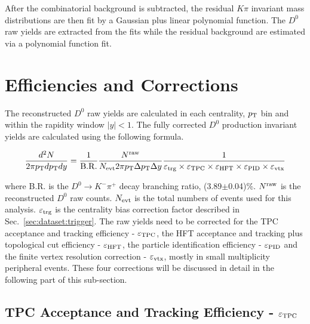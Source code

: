 \documentclass[%
 reprint,	
 amsmath,amssymb,
 aps,
 prc,
]{revtex4-1}
\begin{document}
After the combinatorial background is subtracted, the residual $K\pi$ invariant mass distributions are then fit by a Gaussian plus linear polynomial function. %
The $D^0$ raw yields are extracted from the fits while the residual background are estimated via a polynomial function fit.

\section{\label{sec:correction}Efficiencies and Corrections}
The reconstructed $D^0$ raw yields are calculated in each centrality, $p_{\rm T}$ bin and within the rapidity window $|y|<1$. The fully corrected $D^0$ production invariant yields are calculated using the following formula.

\begin{widetext}
\[
  \frac{d^2N}{2\pi p_{\rm T}dp_{\rm T}dy} = \frac{1}{\rm B.R.} \frac{N^{\rm raw}}{N_{\rm evt} 2\pi p_{\rm T}\Delta p_{\rm T}\Delta y} \frac{1}{\varepsilon_{\rm trg}\times\varepsilon_{\rm TPC}\times\varepsilon_{\rm HFT}\times\varepsilon_{\rm PID}\times\varepsilon_{\rm vtx}}
\]
\label{equ:invariantyield}
\end{widetext}

where B.R. is the $D^0\rightarrow K^-\pi^+$ decay branching ratio, (3.89$\pm$0.04)\%. $N^{\rm raw}$ is the reconstructed $D^0$ raw counts. $N_{\rm evt}$ is the total numbers of events used for this analysis. $\varepsilon_{\rm trg}$ is the centrality bias correction factor described in Sec.~\ref{sec:dataset:trigger}. The raw yields need to be corrected for the TPC acceptance and tracking efficiency - $\varepsilon_{\rm TPC}$, the HFT acceptance and tracking plus topological cut efficiency - $\varepsilon_{\rm HFT}$, the particle identification efficiency - $\varepsilon_{\rm PID}$ and the finite vertex resolution correction - $\varepsilon_{\rm vtx}$, mostly in small multiplicity peripheral events. These four corrections will be discussed in detail in the following part of this sub-section.

\subsection{\label{sec:correction:tpc}TPC Acceptance and Tracking Efficiency - $\varepsilon_{\rm TPC}$}
\end{document}
